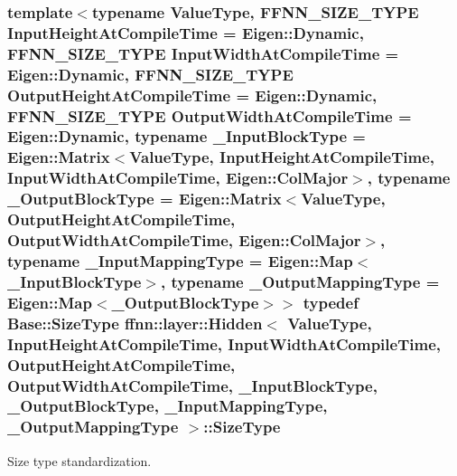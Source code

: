 \hypertarget{classffnn_1_1layer_1_1_hidden_a3deb1dc4b3a83b3d6749474debee025f}{
\subsubsection[{Size\-Type}]{\setlength{\rightskip}{0pt plus 5cm}template$<$typename Value\-Type, F\-F\-N\-N\-\_\-\-S\-I\-Z\-E\-\_\-\-T\-Y\-P\-E Input\-Height\-At\-Compile\-Time = Eigen\-::\-Dynamic, F\-F\-N\-N\-\_\-\-S\-I\-Z\-E\-\_\-\-T\-Y\-P\-E Input\-Width\-At\-Compile\-Time = Eigen\-::\-Dynamic, F\-F\-N\-N\-\_\-\-S\-I\-Z\-E\-\_\-\-T\-Y\-P\-E Output\-Height\-At\-Compile\-Time = Eigen\-::\-Dynamic, F\-F\-N\-N\-\_\-\-S\-I\-Z\-E\-\_\-\-T\-Y\-P\-E Output\-Width\-At\-Compile\-Time = Eigen\-::\-Dynamic, typename \-\_\-\-Input\-Block\-Type = Eigen\-::\-Matrix$<$\-Value\-Type, Input\-Height\-At\-Compile\-Time, Input\-Width\-At\-Compile\-Time, Eigen\-::\-Col\-Major$>$, typename \-\_\-\-Output\-Block\-Type = Eigen\-::\-Matrix$<$\-Value\-Type, Output\-Height\-At\-Compile\-Time, Output\-Width\-At\-Compile\-Time, Eigen\-::\-Col\-Major$>$, typename \-\_\-\-Input\-Mapping\-Type = Eigen\-::\-Map$<$\-\_\-\-Input\-Block\-Type$>$, typename \-\_\-\-Output\-Mapping\-Type = Eigen\-::\-Map$<$\-\_\-\-Output\-Block\-Type$>$$>$ typedef {\bf Base\-::\-Size\-Type} {\bf ffnn\-::layer\-::\-Hidden}$<$ Value\-Type, Input\-Height\-At\-Compile\-Time, Input\-Width\-At\-Compile\-Time, Output\-Height\-At\-Compile\-Time, Output\-Width\-At\-Compile\-Time, \-\_\-\-Input\-Block\-Type, \-\_\-\-Output\-Block\-Type, \-\_\-\-Input\-Mapping\-Type, \-\_\-\-Output\-Mapping\-Type $>$\-::{\bf Size\-Type}}}\label{classffnn_1_1layer_1_1_hidden_a3deb1dc4b3a83b3d6749474debee025f}


Size type standardization. 



